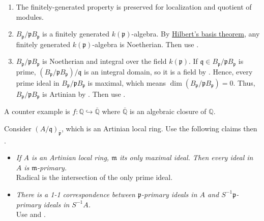 \begin{exercise}\label{ex8.4}
	\begin{enumerate}
		\item[(i) $\Rightarrow$ (iii)] The finitely-generated property is preserved for localization and quotient of modules.
		\item[(ii) $\Rightarrow$ (iii)] $B_\mathfrak{p}/\mathfrak{p}B_\mathfrak{p}$ is a finitely generated $k(\mathfrak{p})$-algebra. By \hyperref[7.5]{Hilbert's basis theorem}, any finitely generated $k(\mathfrak{p})$-algebra is Noetherian. Then use .
		\item[(iii) $\Rightarrow$ (ii),(iv)] $B_\mathfrak{p}/\mathfrak{p}B_\mathfrak{p}$ is Noetherian and integral over the field $k(\mathfrak{p})$. If $\mathfrak{q}\in B_\mathfrak{p}/\mathfrak{p}B_\mathfrak{p}$ is prime, $\left(B_\mathfrak{p}/\mathfrak{p}B_\mathfrak{p}\right)/\mathfrak{q}$ is an integral domain, so it is a field by . Hence, every prime ideal in $B_\mathfrak{p}/\mathfrak{p}B_\mathfrak{p}$ is maximal, which means $\operatorname{dim}\left(B_\mathfrak{p}/\mathfrak{p}B_\mathfrak{p}\right)=0$. Thus, $B_\mathfrak{p}/\mathfrak{p}B_\mathfrak{p}$ is Artinian by . Then use . 
	\end{enumerate}
	A counter example is $f:\mathbb{Q}\hookrightarrow\overline{\mathbb{Q}}$ where $\overline{\mathbb{Q}}$ is an algebraic closure of $\mathbb{Q}$.
\end{exercise}

\begin{exercise}\label{ex8.5}
	
\end{exercise}

\begin{exercise}\label{ex8.6}
 	Consider $(A/\mathfrak{q})_{\overline{\mathfrak{p}}}$, which is an Artinian local ring. Use the following claims then .
 	\begin{itemize}
 		\item \textit{If $A$ is an Artinian local ring, $\mathfrak{m}$ its only maximal ideal. Then every ideal in $A$ is $\mathfrak{m}$-primary.}\\ Radical is the intersection of the only prime ideal.
 		\item \textit{There is a 1-1 correspondence between $\mathfrak{p}$-primary ideals in $A$ and $S^{-1}\mathfrak{p}$-primary ideals in $S^{-1}A$.}\\
 		Use  and .
 	\end{itemize}
\end{exercise}